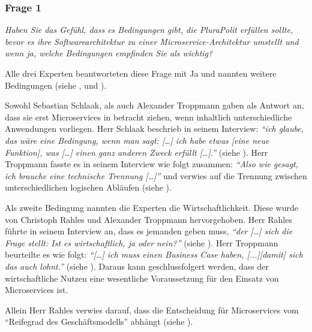 \subsubsection{Frage 1}
\label{sec:frage1}

\textit{Haben Sie das Gefühl, dass es Bedingungen gibt, die PluraPolit erfüllen sollte, bevor es ihre Softwarearchitektur zu einer Microservice-Architektur umstellt und wenn ja, welche Bedingungen empfinden Sie als wichtig?}

Alle drei Experten beantworteten diese Frage mit Ja und nannten weitere Bedingungen (siehe ,  und ).

Sowohl Sebastian Schlaak, als auch Alexander Troppmann gaben als Antwort an, dass sie erst Microservices in betracht ziehen, wenn inhaltlich unterschiedliche Anwendungen vorliegen. Herr Schlaak beschrieb in seinem Interview: \textit{\enquote{ich glaube, das wäre eine Bedingung, wenn man sagt: […] ich habe etwas [eine neue Funktion], was […] einen ganz anderen Zweck erfüllt […].}} (siehe ). Herr Troppmann fasste es in seinem Interview wie folgt zusammen:  \textit{\enquote{Also wie gesagt, ich brauche eine technische Trennung […]}} und verwies auf die Trennung zwischen unterschiedlichen logischen Abläufen (siehe ).

Als zweite Bedingung nannten die Experten die Wirtschaftlichkeit. Diese wurde  von Christoph Rahles und Alexander Troppmann hervorgehoben. Herr Rahles führte in seinem Interview an, dass es jemanden geben muss, \textit{\enquote{der […] sich die Frage stellt: Ist es wirtschaftlich, ja oder nein?}} (siehe ). Herr Troppmann beurteilte es wie folgt: \textit{\enquote{[…] ich muss einen Business Case haben, [...][damit] sich das auch lohnt.}} (siehe ). Daraus kann geschlussfolgert werden, dass der wirtschaftliche Nutzen eine wesentliche Voraussetzung für den Einsatz von Microservices ist.

Allein Herr Rahles verwies darauf, dass die Entscheidung für Microservices vom “Reifegrad des Geschäftsmodells” abhängt (siehe ).
